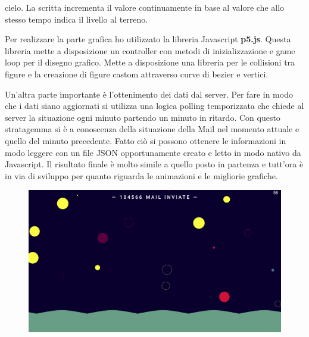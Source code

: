 \documentclass[a4paper]{article}
\begin{document}
cielo. La scritta incrementa il valore continuamente in base al valore che allo stesso tempo
indica il livello al terreno.
\par Per realizzare la parte grafica ho utilizzato la libreria Javascript \textbf{p5.js}.
Questa libreria mette a disposizione un controller con metodi di inizializzazione e game loop
per il disegno grafico. Mette a disposizione una libreria per le collisioni tra figure e la creazione
di figure castom attraverso curve di bezier e vertici.
\par Un'altra parte importante è l'ottenimento dei dati dal server. Per fare in modo che i dati
siano aggiornati si utilizza una logica polling temporizzata che chiede al server la situazione
ogni minuto partendo un minuto in ritardo. Con questo stratagemma si è a conoscenza della situazione della Mail
nel momento attuale e quello del minuto precedente. Fatto ciò si possono ottenere le informazioni
in modo leggere con un file JSON opportunamente creato e letto in modo nativo da Javascript.
Il risultato finale è molto simile a quello posto in partenza e tutt'ora è in via di sviluppo per 
quanto riguarda le animazioni e le migliorie grafiche.
\begin{figure}[H]
	\includegraphics[width=\textwidth]{delivery-final.png}
	\centering
\end{figure}
\end{document}
